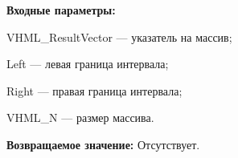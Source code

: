 \textbf{Входные параметры:}

 VHML\_ResultVector --- указатель на массив;
 
 Left --- левая граница интервала;
 
 Right --- правая граница интервала;
 
 VHML\_N --- размер массива.

\textbf{Возвращаемое значение:}
Отсутствует.